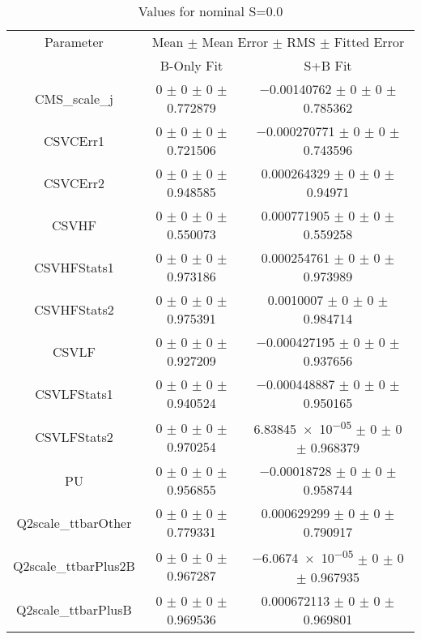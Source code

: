 \begin{table}
\centering
\caption{Values for nominal S=0.0}
\begin{tabular}{ccc}
\toprule
Parameter & \multicolumn{2}{c}{Mean $\pm$ Mean Error $\pm$ RMS $\pm$ Fitted Error}\\
 & B-Only Fit & S+B Fit\\
\midrule
CMS\_scale\_j & \num{0} $\pm$ \num{0} $\pm$ \num{0} $\pm$ \num{0.772879} & \num{-0.00140762} $\pm$ \num{0} $\pm$ \num{0} $\pm$ \num{0.785362}\\
CSVCErr1 & \num{0} $\pm$ \num{0} $\pm$ \num{0} $\pm$ \num{0.721506} & \num{-0.000270771} $\pm$ \num{0} $\pm$ \num{0} $\pm$ \num{0.743596}\\
CSVCErr2 & \num{0} $\pm$ \num{0} $\pm$ \num{0} $\pm$ \num{0.948585} & \num{0.000264329} $\pm$ \num{0} $\pm$ \num{0} $\pm$ \num{0.94971}\\
CSVHF & \num{0} $\pm$ \num{0} $\pm$ \num{0} $\pm$ \num{0.550073} & \num{0.000771905} $\pm$ \num{0} $\pm$ \num{0} $\pm$ \num{0.559258}\\
CSVHFStats1 & \num{0} $\pm$ \num{0} $\pm$ \num{0} $\pm$ \num{0.973186} & \num{0.000254761} $\pm$ \num{0} $\pm$ \num{0} $\pm$ \num{0.973989}\\
CSVHFStats2 & \num{0} $\pm$ \num{0} $\pm$ \num{0} $\pm$ \num{0.975391} & \num{0.0010007} $\pm$ \num{0} $\pm$ \num{0} $\pm$ \num{0.984714}\\
CSVLF & \num{0} $\pm$ \num{0} $\pm$ \num{0} $\pm$ \num{0.927209} & \num{-0.000427195} $\pm$ \num{0} $\pm$ \num{0} $\pm$ \num{0.937656}\\
CSVLFStats1 & \num{0} $\pm$ \num{0} $\pm$ \num{0} $\pm$ \num{0.940524} & \num{-0.000448887} $\pm$ \num{0} $\pm$ \num{0} $\pm$ \num{0.950165}\\
CSVLFStats2 & \num{0} $\pm$ \num{0} $\pm$ \num{0} $\pm$ \num{0.970254} & \num{6.83845e-05} $\pm$ \num{0} $\pm$ \num{0} $\pm$ \num{0.968379}\\
PU & \num{0} $\pm$ \num{0} $\pm$ \num{0} $\pm$ \num{0.956855} & \num{-0.00018728} $\pm$ \num{0} $\pm$ \num{0} $\pm$ \num{0.958744}\\
Q2scale\_ttbarOther & \num{0} $\pm$ \num{0} $\pm$ \num{0} $\pm$ \num{0.779331} & \num{0.000629299} $\pm$ \num{0} $\pm$ \num{0} $\pm$ \num{0.790917}\\
Q2scale\_ttbarPlus2B & \num{0} $\pm$ \num{0} $\pm$ \num{0} $\pm$ \num{0.967287} & \num{-6.0674e-05} $\pm$ \num{0} $\pm$ \num{0} $\pm$ \num{0.967935}\\
Q2scale\_ttbarPlusB & \num{0} $\pm$ \num{0} $\pm$ \num{0} $\pm$ \num{0.969536} & \num{0.000672113} $\pm$ \num{0} $\pm$ \num{0} $\pm$ \num{0.969801}\\

\end{tabular}
\end{table}
